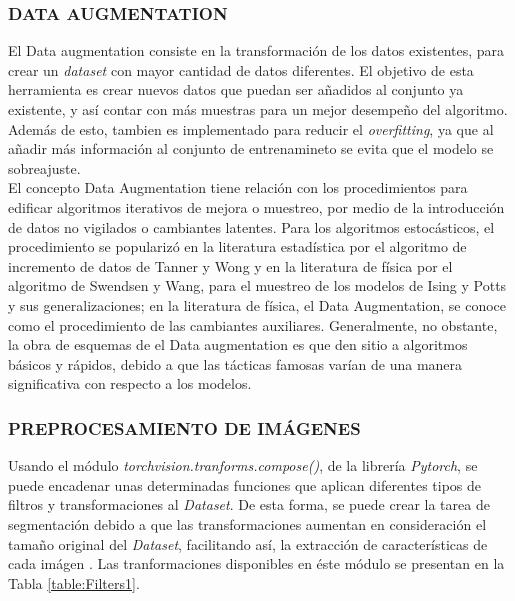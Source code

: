 			\subsubsection{DATA AUGMENTATION}

			El Data augmentation consiste en la transformación de los datos existentes, para crear un \textit{dataset} con mayor cantidad de datos diferentes. El objetivo de esta herramienta es crear nuevos datos que puedan ser añadidos al conjunto ya existente, y así contar con más muestras para un mejor desempeño del algoritmo. Además de esto, tambien es implementado para reducir el \textit{overfitting}, ya que al añadir más información al conjunto de entrenamineto se evita que el modelo se sobreajuste. \\


			El concepto Data Augmentation tiene relación con los procedimientos para edificar algoritmos iterativos de mejora o muestreo, por medio de la introducción de datos no vigilados o cambiantes latentes. Para los algoritmos estocásticos, el procedimiento se popularizó en la literatura estadística por el algoritmo de incremento de datos de Tanner y Wong y en la literatura de física por el algoritmo de Swendsen y Wang, para el muestreo de los modelos de Ising y Potts y sus generalizaciones; en la literatura de física, el Data Augmentation, se conoce como el procedimiento de las cambiantes auxiliares. Generalmente, no obstante, la obra de esquemas de el Data augmentation es que den sitio a algoritmos básicos y rápidos, debido a que las tácticas famosas varían de una manera significativa con respecto a los modelos.\cite{van2001art}
					
			 
			\newpage
			\subsubsection{PREPROCESAMIENTO DE IMÁGENES}

			Usando el módulo \textit{torchvision.tranforms.compose()}, de la librería \textit{Pytorch}, se puede encadenar unas determinadas funciones que aplican diferentes tipos de filtros y transformaciones al \textit{Dataset}. De esta forma, se puede crear la tarea de segmentación debido a que las transformaciones aumentan en consideración el tamaño original del \textit{Dataset}, facilitando así, la extracción de características de cada imágen \cite{Pytorch}. Las tranformaciones disponibles en éste módulo se presentan en la Tabla \ref{table:Filters1}.
			
